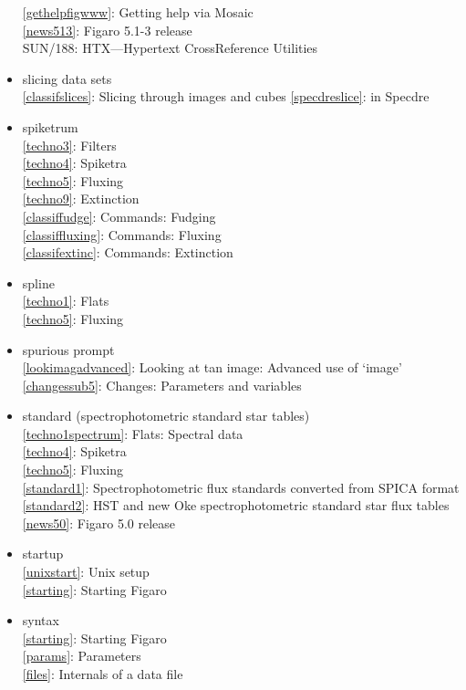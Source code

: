 \documentclass[11pt,twoside]{article}
\newcommand{\htmlref}[2]{#1}
\newcommand{\xref}[3]{#1}
\newcommand{\idxint}[2]{\ref{#1}: \htmlref{#2}{#1}}
\newcommand{\idxint}[2]{\htmlref{#2}{#1}}
\newcommand{\latorhtm}[2]{#1}
\newcommand{\latorhtm}[2]{#2}
\begin{document}
\begin{itemize}
   \idxint{gethelpfigwww}{Getting help via Mosaic}\\
   \idxint{news513}{Figaro 5.1-3 release}\\
   \xref{SUN/188: HTX\latorhtm{---}{-}Hypertext Cross\-Ref\-er\-ence Utilities}{sun188}{}
\item slicing data sets\\
   \idxint{classifslices}{Slicing through images and cubes}
   \idxint{specdreslice}{in Specdre}
\item spiketrum\\
   \idxint{techno3}{Filters}\\
   \idxint{techno4}{Spiketra}\\
   \idxint{techno5}{Fluxing}\\
   \idxint{techno9}{Extinction}\\
   \idxint{classiffudge}{Commands: Fudging}\\
   \idxint{classiffluxing}{Commands: Fluxing}\\
   \idxint{classifextinc}{Commands: Extinction}
\item spline\\
   \idxint{techno1}{Flats}\\
   \idxint{techno5}{Fluxing}
\item spurious prompt\\
   \idxint{lookimagadvanced}{Looking at tan image: Advanced use of `image'}\\
   \idxint{changessub5}{Changes: Parameters and variables}
\item standard (spectrophotometric standard star tables)\\
   \idxint{techno1spectrum}{Flats: Spectral data}\\
   \idxint{techno4}{Spiketra}\\
   \idxint{techno5}{Fluxing}\\
   \idxint{standard1}{Spectrophotometric flux standards converted from
      SPICA format}\\
   \idxint{standard2}{HST and new Oke spectrophotometric standard star
      flux tables}\\
   \idxint{news50}{Figaro 5.0 release}
\item startup\\
   \idxint{unixstart}{Unix setup}\\
   \idxint{starting}{Starting Figaro}
\item syntax\\
   \idxint{starting}{Starting Figaro}\\
   \idxint{params}{Parameters}\\
   \idxint{files}{Internals of a data file}
\end{itemize}
\end{document}
